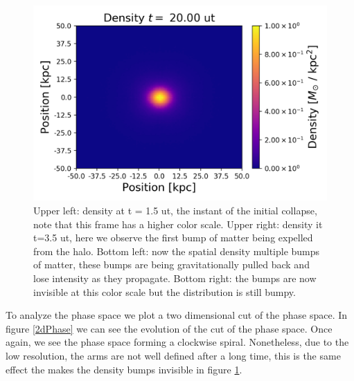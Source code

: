 {\begin{figure}[h!]
    \includegraphics[scale=0.45]{imag/2dDens40.png}
    \caption{Upper left: density at t = 1.5 ut, the instant of the initial collapse, note that this frame has a higher color scale. Upper right: density it t=3.5 ut, here we observe the first bump of matter being expelled from the halo. Bottom left: now the spatial density multiple bumps of matter, these bumps are being gravitationally pulled back and lose intensity as they propagate. Bottom right: the bumps are now invisible at this color scale but the distribution is still bumpy. }
    \label{2dDens}
\end{figure}



To analyze the phase space we plot a two dimensional cut of the phase space. In figure \ref{2dPhase} we can see the evolution of the cut of the phase space. Once again, we see the phase space forming a clockwise spiral. Nonetheless, due to the low resolution, the arms are not well defined after a long time, this is the same effect the makes the density bumps invisible in figure \ref{2dDens}.

}
